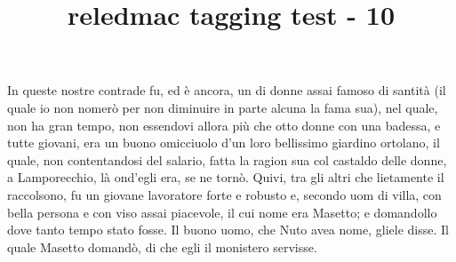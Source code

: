 \documentclass{article}
\title{reledmac tagging test - 10}
\begin{document}
\beginnumbering
\pstart
In queste nostre contrade fu, ed è ancora, un  di donne assai famoso di santità
(il quale io non nomerò per non diminuire in parte alcuna la fama sua), nel quale, non ha gran
tempo, non essendovi allora più che otto donne con una badessa, e tutte giovani, era un buono
omicciuolo d'un loro bellissimo giardino ortolano, il quale, non contentandosi del salario, fatta la
ragion sua col castaldo delle donne, a Lamporecchio, là ond'egli era, se ne tornò. Quivi, tra gli
altri che lietamente il raccolsono, fu un giovane lavoratore forte e robusto e, secondo uom di villa,
con bella persona e con viso assai piacevole, il cui nome era Masetto; e
domandollo dove tanto tempo stato fosse. Il buono uomo, che Nuto avea nome,
gliele disse. Il quale Masetto domandò, di che egli il monistero servisse. 
\pend
\endnumbering
\printglossaries
\end{document}

